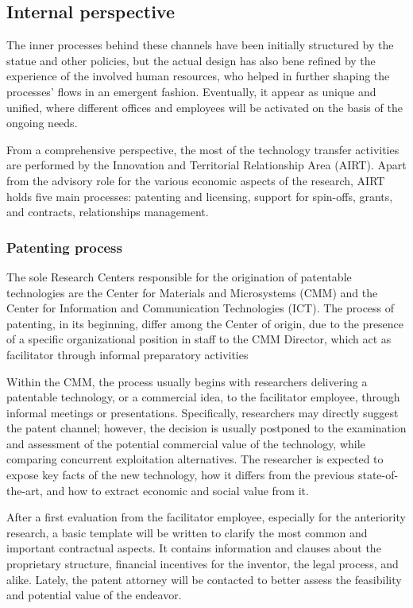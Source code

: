\subsection{Internal perspective}

The inner processes behind these channels have been initially structured by the statue and other policies, but the actual design has also bene refined by the experience of the involved human resources, who helped in further shaping the processes' flows in an emergent fashion. Eventually, it appear as unique and unified, where different offices and employees will be activated on the basis of the ongoing needs. 

From a comprehensive perspective, the most of the technology transfer activities are performed by the Innovation and Territorial Relationship Area (AIRT). Apart from the advisory role for the various economic aspects of the research, AIRT holds five main processes: patenting and licensing, support for spin-offs, grants, and contracts, relationships management.

\subsubsection{Patenting process}

The sole Research Centers responsible for the origination of patentable technologies are the Center for Materials and Microsystems (CMM) and the Center for Information and Communication Technologies (ICT). The process of patenting, in its beginning, differ among the Center of origin, due to the presence of a specific organizational position in staff to the CMM Director, which act as facilitator through informal preparatory activities

Within the CMM, the process usually begins with researchers delivering a patentable technology, or a commercial idea, to the facilitator employee, through informal meetings or presentations. Specifically, researchers may directly suggest the patent channel; however, the decision is usually postponed to the examination and assessment of the potential commercial value of the technology, while comparing concurrent exploitation alternatives. The researcher is expected to expose key facts of the new technology, how it differs from the previous state-of-the-art, and how to extract economic and social value from it. 

After a first evaluation from the facilitator employee, especially for the anteriority research, a basic template will be written to clarify the most common and important contractual aspects. It contains information and clauses about the proprietary structure, financial incentives for the inventor, the legal process, and alike. Lately, the patent attorney will be contacted to better assess the feasibility and potential value of the endeavor. 

